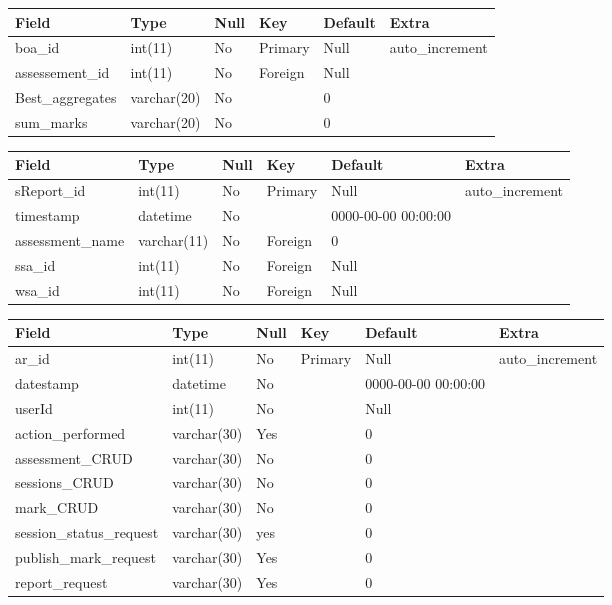 \documentclass[12pt]{article}
\begin{document}
					
					\newpage
					\begin{tabular}{|p{1.0in}|p{1.0in}|p{0.4in}|p{0.5in}|p{0.9in}|p{1.1in}|} \hline
					Field & Type & Null & Key & Default & Extra \\ \hline
					boa\_id & int(11) & No & Primary & Null & auto\_increment \\ \hline
					assessement\_id & int(11) & No & Foreign & Null &  \\ \hline
					Best\_aggregates & varchar(20) & No &  & 0 &  \\ \hline
					sum\_marks & varchar(20) & No &  & 0 &  \\ \hline
					\end{tabular}
					
					
					
					
					\begin{tabular}{|p{1.0in}|p{1.0in}|p{0.4in}|p{0.4in}|p{1.0in}|p{1.1in}|} \hline
					Field & Type & Null & Key & Default & Extra \\ \hline
					sReport\_id & int(11) & No & Primary & Null & auto\_increment \\ \hline
					timestamp & datetime & No &  & 0000-00-00 00:00:00 &  \\ \hline
					assessment\_name & varchar(11) & No & Foreign & 0 &  \\ \hline
					ssa\_id & int(11) & No & Foreign & Null &  \\ \hline
					wsa\_id & int(11) & No & Foreign & Null &  \\ \hline
					\end{tabular}
					
					
					
					\begin{tabular}{|p{1.1in}|p{0.9in}|p{0.5in}|p{0.4in}|p{1.0in}|p{1.1in}|} \hline
					Field & Type & Null & Key & Default & Extra \\ \hline
					ar\_id & int(11) & No & Primary & Null & auto\_increment \\ \hline
					datestamp & datetime & No &  & 0000-00-00 00:00:00 &  \\ \hline
					userId & int(11) & No &  & Null &  \\ \hline
					action\_performed & varchar(30) & Yes &  & 0 &  \\ \hline
					assessment\_CRUD & varchar(30) & No &  & 0 &  \\ \hline
					sessions\_CRUD & varchar(30) & No &  & 0 &  \\ \hline
					mark\_CRUD & varchar(30) & No &  & 0 &  \\ \hline
					session\_status\_request & varchar(30) & yes &  & 0 &  \\ \hline
					publish\_mark\_request & varchar(30) & Yes &  & 0 &  \\ \hline
					report\_request & varchar(30) & Yes &  & 0 &  \\ \hline
					\end{tabular}
					
\end{document}
